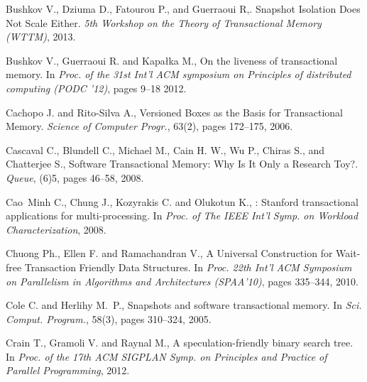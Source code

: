\begin{thebibliography}{99}
{
Bushkov V., Dziuma D., Fatourou P., and Guerraoui R,.
Snapshot Isolation Does Not Scale Either.
{\it 5th Workshop on the Theory of Transactional Memory (WTTM)}, 2013.



Bushkov V., Guerraoui R. and Kapa\l{}ka M.,
\newblock On the liveness of transactional memory.
\newblock In {\it Proc. of the 31st  Int'l ACM symposium on Principles of distributed computing (PODC '12)},
pages 9--18 2012.



Cachopo J. and Rito-Silva A., 
Versioned Boxes as the Basis for Transactional Memory. 
{\it Science of Computer Progr.}, 63(2), pages 172--175, 2006. 



Cascaval C., Blundell C., Michael M., Cain H. W., Wu P., Chiras S., and Chatterjee S.,
Software Transactional Memory: Why Is It Only a Research Toy?.
{\it Queue}, (6)5,  pages 46--58, 2008.



Cao~Minh C., Chung J., Kozyrakis C. and Olukotun K.,
: Stanford transactional applications for multi-processing.
\newblock In {\em Proc. of The IEEE Int'l Symp. on Workload Characterization},
  2008.



Chuong Ph., Ellen F. and Ramachandran V.,
A Universal Construction for Wait-free Transaction Friendly Data Structures.
In {\it Proc. 22th  Int'l  ACM Symposium on Parallelism in Algorithms 
and Architectures   (SPAA'10)}, pages 335--344,  2010. 

Cole C. and Herlihy M.~P.,
\newblock Snapshots and software transactional memory.
\newblock In {\em Sci. Comput. Program.}, 58(3), pages 310--324, 2005.



Crain T., Gramoli V. and Raynal M.,
\newblock A speculation-friendly binary search tree.
\newblock In {\em Proc. of the 17th ACM SIGPLAN Symp. on Principles and
  Practice of Parallel Programming}, 2012.

}
\end{thebibliography}
